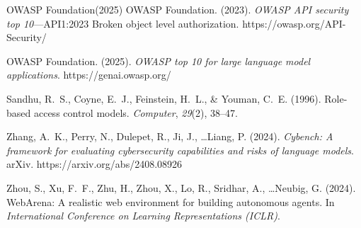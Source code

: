 \documentclass[11pt,a4paper]{article}
\begin{document}
\begin{thebibliography}{OWASP Foundation(2025)}
OWASP Foundation. (2023). \emph{OWASP API security top 10}---API1:2023 Broken object
level authorization. https://owasp.org/API-Security/

OWASP Foundation. (2025). \emph{OWASP top 10 for large language model applications}.
https://genai.owasp.org/

Sandhu, R.~S., Coyne, E.~J., Feinstein, H.~L., \& Youman, C.~E. (1996). Role-based
access control models. \emph{Computer}, \emph{29}(2), 38--47.

Zhang, A.~K., Perry, N., Dulepet, R., Ji, J., \ldots Liang, P. (2024). \emph{Cybench: A
framework for evaluating cybersecurity capabilities and risks of language models}.
arXiv. https://arxiv.org/abs/2408.08926

Zhou, S., Xu, F.~F., Zhu, H., Zhou, X., Lo, R., Sridhar, A., \ldots Neubig, G. (2024).
WebArena: A realistic web environment for building autonomous agents. In
\emph{International Conference on Learning Representations (ICLR)}.

\end{thebibliography}
\end{document}
